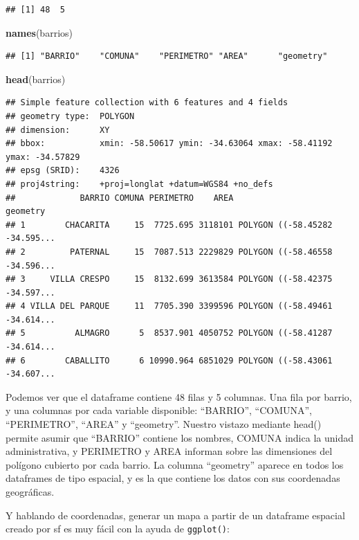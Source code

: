 \documentclass[]{book}
\newenvironment{Shaded}{\begin{snugshade}}{\end{snugshade}}
\newcommand{\KeywordTok}[1]{\textcolor[rgb]{0.13,0.29,0.53}{\textbf{#1}}}
\newcommand{\NormalTok}[1]{#1}
\begin{document}
\begin{verbatim}
## [1] 48  5
\end{verbatim}

\begin{Shaded}
\begin{Highlighting}[]
\KeywordTok{names}\NormalTok{(barrios)}
\end{Highlighting}
\end{Shaded}

\begin{verbatim}
## [1] "BARRIO"    "COMUNA"    "PERIMETRO" "AREA"      "geometry"
\end{verbatim}

\begin{Shaded}
\begin{Highlighting}[]
\KeywordTok{head}\NormalTok{(barrios)}
\end{Highlighting}
\end{Shaded}

\begin{verbatim}
## Simple feature collection with 6 features and 4 fields
## geometry type:  POLYGON
## dimension:      XY
## bbox:           xmin: -58.50617 ymin: -34.63064 xmax: -58.41192 ymax: -34.57829
## epsg (SRID):    4326
## proj4string:    +proj=longlat +datum=WGS84 +no_defs
##             BARRIO COMUNA PERIMETRO    AREA                       geometry
## 1        CHACARITA     15  7725.695 3118101 POLYGON ((-58.45282 -34.595...
## 2         PATERNAL     15  7087.513 2229829 POLYGON ((-58.46558 -34.596...
## 3     VILLA CRESPO     15  8132.699 3613584 POLYGON ((-58.42375 -34.597...
## 4 VILLA DEL PARQUE     11  7705.390 3399596 POLYGON ((-58.49461 -34.614...
## 5          ALMAGRO      5  8537.901 4050752 POLYGON ((-58.41287 -34.614...
## 6        CABALLITO      6 10990.964 6851029 POLYGON ((-58.43061 -34.607...
\end{verbatim}

Podemos ver que el dataframe contiene 48 filas y 5 columnas. Una fila
por barrio, y una columnas por cada variable disponible: ``BARRIO'',
``COMUNA'', ``PERIMETRO'', ``AREA'' y ``geometry''. Nuestro vistazo
mediante head() permite asumir que ``BARRIO'' contiene los nombres,
COMUNA indica la unidad administrativa, y PERIMETRO y AREA informan
sobre las dimensiones del polígono cubierto por cada barrio. La columna
``geometry'' aparece en todos los dataframes de tipo espacial, y es la
que contiene los datos con sus coordenadas geográficas.

Y hablando de coordenadas, generar un mapa a partir de un dataframe
espacial creado por sf es muy fácil con la ayuda de \texttt{ggplot()}:
\end{document}
